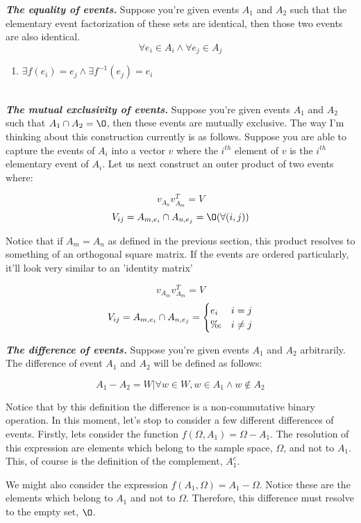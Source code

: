 \documentclass{article}
\begin{document}
\textbf{\textit{The equality of events.}} Suppose you're given events \(A_1\) and \(A_2\) such that the elementary event factorization of these sets are identical, then those two events are also identical.
\\
\[\forall e_i \in A_i \land \forall e_j \in A_j \]
\begin{enumerate}
    \item \(\exists f(e_i) = e_j \land \exists f^{-1}(e_j) = e_i\)
\end{enumerate}
\\
\textbf{\textit{The mutual exclusivity of events.}} Suppose you're given events \(A_1\) and \(A_2\) such that \(A_1 \cap A_2 = \O\), then these events are mutually exclusive. The way I'm thinking about this construction currently is as follows. Suppose you are able to capture the events of \(A_i\) into a vector \(v\) where the \(i^{th}\) element of \(v\) is the \(i^{th}\) elementary event of \(A_i\). Let us next construct an outer product of two events where:

\[v_{A_n} v_{A_m}^{T} = V\]
\[V_{ij} = A_{m,e_{i}} \cap A_{n,e_{j}} = \O (\forall (i,j))\]

Notice that if \(A_m = A_n\) as defined in the previous section, this product resolves to something of an orthogonal square matrix. If the events are ordered particularly, it'll look very similar to an 'identity matrix'

\[v_{A_m} v_{A_m}^{T} = V\]
\[V_{ij} = A_{m,e_{i}} \cap A_{n,e_{j}} =
\begin{cases}
e_{i} & i=j \\
\O & i \neq j
\end{cases}\]

\textbf{\textit{The difference of events.}}  Suppose you're given events \(A_1\) and \(A_2\) arbitrarily. The difference of event \(A_1\) and \(A_2\) will be defined as follows:

\[A_1 - A_2 = W | \forall w \in W, w \in A_1 \land w \not\in A_2\]

Notice that by this definition the difference is a non-commutative binary operation. In this moment, let's stop to consider a few different differences of events. Firstly, lets consider the function \(f(\Omega, A_1) = \Omega - A_1\). The resolution of this expression are elements which belong to the sample space, \(\Omega\), and not to \(A_1\). This, of course is the definition of the complement, \(A_{1}^{c}\).

We might also consider the expression \(f(A_1,\Omega) = A_1 - \Omega\). Notice these are the elements which belong to \(A_1\) and not to \(\Omega\). Therefore, this difference must resolve to the empty set, \(\O\).
\end{document}
